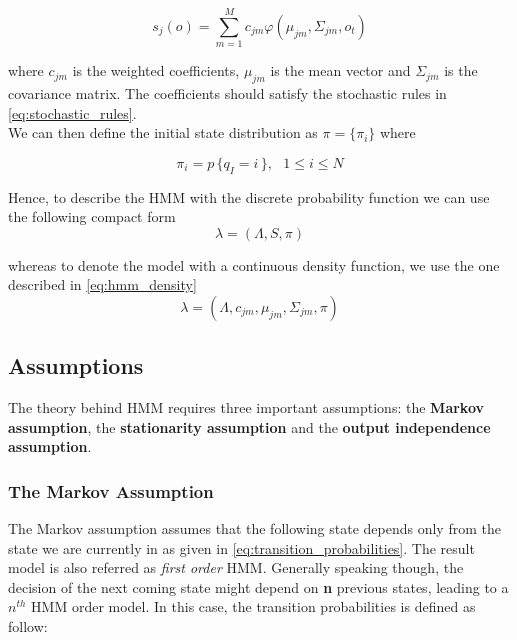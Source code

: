 \begin{equation}
	s_{j}(o) = \sum_{m = 1}^{M} c_{jm}\varphi (\mu_{jm}, \Sigma_{jm}, o_{t})
\end{equation}

\noindent where $c_{jm}$ is the weighted coefficients, $\mu_{jm}$ is the mean vector and $\Sigma_{jm}$ is the covariance matrix. The coefficients should satisfy the stochastic rules in \ref{eq:stochastic_rules}. \\
\noindent We can then define the initial state distribution as $\pi = \{\pi_{i}\}$ where 

\begin{equation}
	\pi_{i} = p \, \{ q_{I} = i \, \}, \,\,\,\, 1 \leq i \leq N
\end{equation} 

\noindent Hence, to describe the HMM with the discrete probability function we can use the following compact form
\begin{equation}
\label{eq:hmm_discrete}
	\lambda = (\Lambda, S, \pi )
\end{equation}

\noindent whereas to denote the model with a continuous density function, we use the one described in \ref{eq:hmm_density}
\begin{equation}
\label{eq:hmm_density}
\lambda = (\Lambda, c_{jm}, \mu_{jm}, \Sigma_{jm}, \pi )
\end{equation} 

\subsection{Assumptions}
\label{sub:assumptions_hmm}
The theory behind HMM requires three important assumptions: the \textbf{Markov assumption}, the \textbf{stationarity assumption} and the \textbf{output independence assumption}.

\subsubsection{The Markov Assumption}
The Markov assumption assumes that the following state depends only from the state we are currently in as given in \ref{eq:transition_probabilities}. The result model is also referred as \textit{first order} HMM. Generally speaking though, the decision of the next coming state might depend on \textbf{n} previous states, leading to a $n^{th}$ HMM order model. In this case, the transition probabilities is defined as follow:

